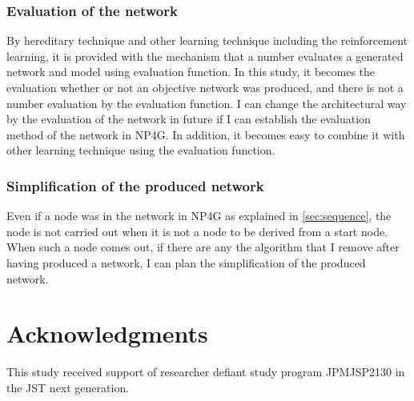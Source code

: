 \documentclass{article}
\begin{document}
\subsubsection {Evaluation of the network}
By hereditary technique and other learning technique including the reinforcement learning, it is provided with the mechanism that a number evaluates a generated network and model using evaluation function.
In this study, it becomes the evaluation whether or not an objective network was produced, and there is not a number evaluation by the evaluation function.
I can change the architectural way by the evaluation of the network in future if I can establish the evaluation method of the network in NP4G.
In addition, it becomes easy to combine it with other learning technique using the evaluation function.
\subsubsection {Simplification of the produced network}
Even if a node was in the network in NP4G as explained in \ref{sec:sequence}, the node is not carried out when it is not a node to be derived from a start node.
When such a node comes out, if there are any the algorithm that I remove after having produced a network, I can plan the simplification of the produced network.
\section*{Acknowledgments}
This study received support of researcher defiant study program JPMJSP2130 in the JST next generation.


  
  
\end{document}
